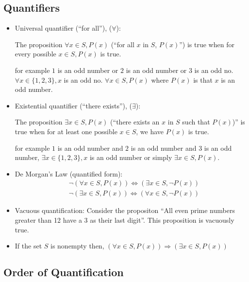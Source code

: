 \documentclass[12pt,a4paper]{article}
\begin{document}
 \subsection{Quantifiers} 
\begin{itemize}
    \item Universal quantifier (``for all''), (\(\forall \)): 
    
    The proposition \(\forall x \in S, P(x)\) (``for all \(x\) in \(S\), \( P(x)\)'') is true when for every possible \(x \in S, P(x)\) is true.
   
    for example \(1\) is an odd number or \(2\) is an odd number or \(3\) is an odd no. 
    \(\forall x \in \{1,2,3\}, x\) is an odd no.
    \( \forall x \in S, P(x) \) where \(P(x)\) is that \(x\) is an odd number.  

    \item Existential quantifier (``there exists''), (\(\exists \)): 
    
    The proposition \(\exists x \in S, P(x)\) (``there exists an \(x\) in \(S\) such that \(P(x)\))'' is true when for at least one possible \(x \in S\), we have \(P(x)\) is true.

    for example \(1\)   is an odd number and \(2\) is an odd number and \(3\) is an odd number, \( \exists x \in \{1,2,3\}, x\) is an odd number or simply \(\exists x \in S, P(x)\). 

    \item De Morgan's Law (quantified form):
    \begin{align*}
        & \neg(\forall x \in S, P(x)) \Leftrightarrow(\exists x \in S, \neg P(x)) \\
        & \neg(\exists x \in S, P(x)) \Leftrightarrow(\forall x \in S, \neg P(x))
    \end{align*}

    \item Vacuous quantification: Consider the propositon ``All even prime numbers greater than 12 have a 3 as their last digit''. This proposition is vacuously true.
    \item If the set \(S\) is nonempty then, \(\left( \forall x \in S, P(x) \right) \Rightarrow \left( \exists x \in S, P(x) \right) \)   
\end{itemize}

 \subsection{Order of Quantification}
 
\end{document}
